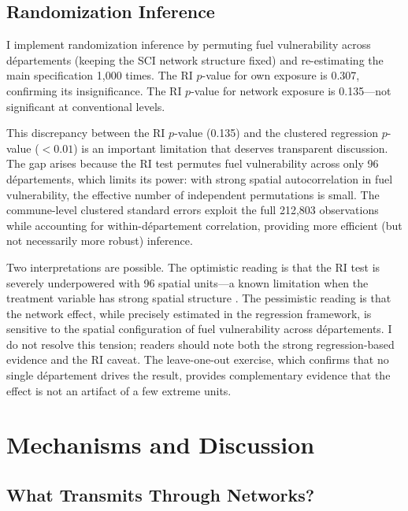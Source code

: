 \documentclass[12pt]{article}
\newcommand{\dept}{d\'{e}partement}
\newcommand{\depts}{d\'{e}partements}
\begin{document}
\subsection{Randomization Inference}

I implement randomization inference by permuting fuel vulnerability across \depts{} (keeping the SCI network structure fixed) and re-estimating the main specification 1,000 times. The RI $p$-value for own exposure is 0.307, confirming its insignificance. The RI $p$-value for network exposure is 0.135---not significant at conventional levels.

This discrepancy between the RI $p$-value (0.135) and the clustered regression $p$-value ($<0.01$) is an important limitation that deserves transparent discussion. The gap arises because the RI test permutes fuel vulnerability across only 96 \depts{}, which limits its power: with strong spatial autocorrelation in fuel vulnerability, the effective number of independent permutations is small. The commune-level clustered standard errors exploit the full 212,803 observations while accounting for within-\dept{} correlation, providing more efficient (but not necessarily more robust) inference.

Two interpretations are possible. The optimistic reading is that the RI test is severely underpowered with 96 spatial units---a known limitation when the treatment variable has strong spatial structure \citep{young2019channeling}. The pessimistic reading is that the network effect, while precisely estimated in the regression framework, is sensitive to the spatial configuration of fuel vulnerability across \depts{}. I do not resolve this tension; readers should note both the strong regression-based evidence and the RI caveat. The leave-one-out exercise, which confirms that no single \dept{} drives the result, provides complementary evidence that the effect is not an artifact of a few extreme units.



\section{Mechanisms and Discussion}
\label{sec:mechanisms}

\subsection{What Transmits Through Networks?}
\end{document}
